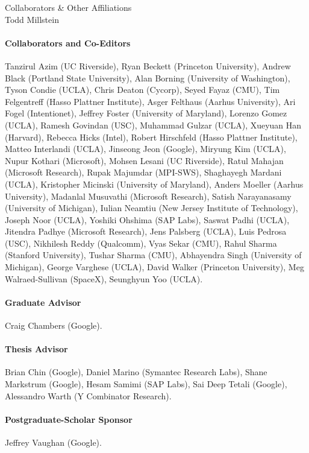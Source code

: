 \documentclass[12pt]{article}
\begin{document}
 \begin{large}
\begin{center}
Collaborators \& Other Affiliations \\
Todd Millstein
\end{center}
\end{large}
\setcounter{page}{1}

\paragraph{Collaborators and Co-Editors}
Tanzirul Azim (UC Riverside),
Ryan Beckett (Princeton University),
Andrew Black (Portland State University),
Alan Borning (University of Washington),
Tyson Condie (UCLA),
Chris Deaton (Cycorp),
Seyed Fayaz (CMU),
Tim Felgentreff (Hasso Plattner Institute),
Asger Felthaus (Aarhus University),
Ari Fogel (Intentionet),
Jeffrey Foster (University of Maryland),
Lorenzo Gomez (UCLA),
Ramesh Govindan (USC),
Muhammad Gulzar (UCLA),
Xueyuan Han (Harvard),
Rebecca Hicks (Intel),
Robert Hirschfeld (Hasso Plattner Institute),
Matteo Interlandi (UCLA),
Jinseong Jeon (Google),
Miryung Kim (UCLA),
Nupur Kothari (Microsoft),
Mohsen Lesani (UC Riverside),
Ratul Mahajan (Microsoft Research),
Rupak Majumdar (MPI-SWS),
Shaghayegh Mardani (UCLA),
Kristopher Micinski (University of Maryland),
Anders Moeller (Aarhus University),
Madanlal Musuvathi (Microsoft Research),
Satish Narayanasamy (University of Michigan),
Iulian Neamtiu (New Jersey Institute of Technology),
Joseph Noor (UCLA),
Yoshiki Ohshima (SAP Labs),
Saswat Padhi (UCLA),
Jitendra Padhye (Microsoft Research),
Jens Palsberg (UCLA),
Luis Pedrosa (USC),
Nikhilesh Reddy (Qualcomm),
Vyas Sekar (CMU),
Rahul Sharma (Stanford University),
Tushar Sharma (CMU),
Abhayendra Singh (University of Michigan),
George Varghese (UCLA),
David Walker (Princeton University),
Meg Walraed-Sullivan (SpaceX),
Seunghyun Yoo (UCLA).

\paragraph{Graduate Advisor} Craig Chambers (Google).

\paragraph{Thesis Advisor}
Brian Chin (Google),
Daniel Marino (Symantec Research Labs),
Shane Markstrum (Google),
Hesam Samimi (SAP Labs),
Sai Deep Tetali (Google),
Alessandro Warth (Y Combinator Research).

\paragraph{Postgraduate-Scholar Sponsor}
Jeffrey Vaughan (Google).
\end{document}
